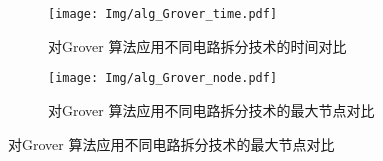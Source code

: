 \documentclass{article}
\begin{document}
\begin{itemize}[leftmargin=*]
\begin{itemize}
        \begin{figure}[!htbp]
            \centering
            \begin{subfigure}[b]{.4\textwidth}
                \centering
                \texttt{[image: Img/alg\_Grover\_time.pdf]}
                \caption{对Grover 算法应用不同电路拆分技术的时间对比}
                \label{fig:grover-time}
            \end{subfigure}
            \qquad
            \begin{subfigure}[b]{.4\textwidth}
                \centering
                \texttt{[image: Img/alg\_Grover\_node.pdf]}
                \caption{对Grover 算法应用不同电路拆分技术的最大节点对比}
                \label{fig:grover-node}
            \end{subfigure}
            

\end{figure}
\end{itemize}
\end{itemize}
\end{document}
